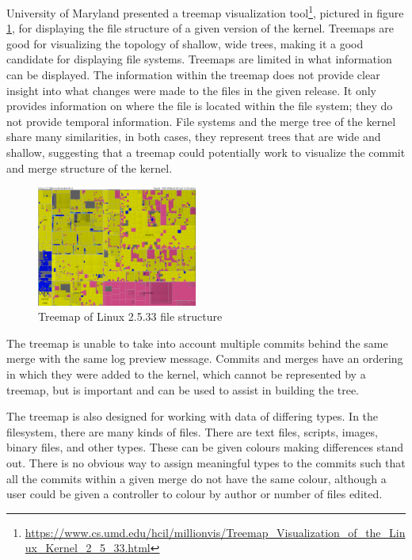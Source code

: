 \documentclass[conference, draftclsnofoot, draft]{IEEEtran}
\begin{document}
University of Maryland presented a treemap visualization
tool\footnote{\url{https://www.cs.umd.edu/hcil/millionvis/Treemap_Visualization_of_the_Linux_Kernel_2_5_33.html}},
pictured in figure \ref{fig:treemap}, for displaying the file structure of a given
version of the kernel. Treemaps are good for visualizing the topology of shallow,
wide trees, making it a good candidate for displaying file systems. Treemaps are
limited in what information can be displayed. The information within the treemap
does not provide clear insight into what changes were made to the files in the given
release. It only provides information on where the file is located within the file
system; they do not provide temporal information. File systems and the merge
tree of the kernel share many similarities, in both cases, they represent trees that
are wide and shallow, suggesting that a treemap could potentially work to visualize
the commit and merge structure of the kernel.

\begin{figure}
        \centering
        \includegraphics[width=0.47\textwidth]{figures/kernel-files.png}
        \caption{Treemap of Linux 2.5.33 file structure}
        \label{fig:treemap}
\end{figure}

The treemap is unable to take into account multiple commits behind the same merge
with the same log preview message. Commits and merges have an ordering in which they
were added to the kernel, which cannot be represented by a treemap, but is important
and can be used to assist in building the tree.

The treemap is also designed for working with data of differing types. In the
filesystem, there are many kinds of files. There are text files, scripts, images,
binary files, and other types. These can be given colours making differences stand
out. There is no obvious way to assign meaningful types to the commits such that all
the commits within a given merge do not have the same colour, although a user
could be given a controller to colour by author or number of files edited.
\end{document}
